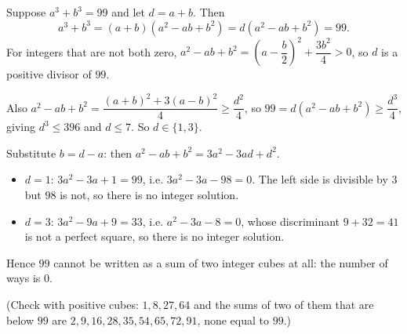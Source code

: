 Suppose $a^3+b^3=99$ and let $d=a+b$. Then
\[a^3+b^3=(a+b)\left(a^2-ab+b^2\right)=d\left(a^2-ab+b^2\right)=99.\]
For integers that are not both zero, $a^2-ab+b^2=\left(a-\dfrac {b}{2}\right)^2+\dfrac{3b^2}{4}>0$, so $d$ is a positive divisor of $99$.

Also $a^2-ab+b^2=\dfrac{(a+b)^2+3(a-b)^2}{4}\ge\dfrac{d^2}{4}$, so $99=d\left(a^2-ab+b^2\right)\ge\dfrac{d^3}{4}$, giving $d^3\le396$ and $d\le7$. So $d\in\{1,3\}$.

Substitute $b=d-a$: then $a^2-ab+b^2=3a^2-3ad+d^2$.
\begin{itemize}
\item $d=1$: $3a^2-3a+1=99$, i.e. $3a^2-3a-98=0$. The left side is divisible by $3$ but $98$ is not, so there is no integer solution.
\item $d=3$: $3a^2-9a+9=33$, i.e. $a^2-3a-8=0$, whose discriminant $9+32=41$ is not a perfect square, so there is no integer solution.
\end{itemize}
Hence $99$ cannot be written as a sum of two integer cubes at all: the number of ways is $\boxed{0}$.

(Check with positive cubes: $1,8,27,64$ and the sums of two of them that are below $99$ are $2,9,16,28,35,54,65,72,91$, none equal to $99$.)
